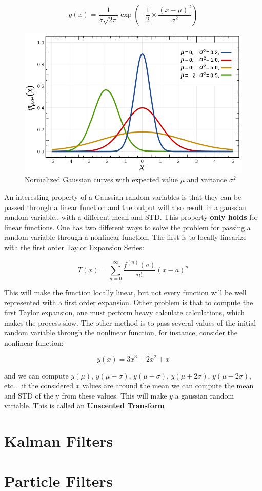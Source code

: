 \begin{equation}
    \label{eq: gaussian pdf}
    g(x) = \frac{1}{\sigma\sqrt{2\pi}}\exp(-\frac{1}{2}\times\frac{(x - \mu)^2}{\sigma^2})
\end{equation}

\begin{figure}[H]
    \centering
    \includegraphics[width=0.5\linewidth]{images/statistics/Normal_Distribution_PDF.png}
    \caption{Normalized Gaussian curves with expected value $\mu$ and variance $\sigma^2$ \cite{enwiki:1100476982}}
    \label{fig: normal pdf}
\end{figure}

An interesting property of a Gaussian random variables is that they can be passed through a linear function and the output will also result in a gaussian random variable,, with a different mean and \acs*{STD}. This property \textbf{only holds} for linear functions. One has two different ways to solve the problem for passing a random variable through a nonlinear function. The first is to locally linearize with the first order Taylor Expansion Series:

\begin{equation}
    T(x) = \sum_{n=0}^{\infty} \frac{f^{(n)}(a)}{n!}(x-a)^n
\end{equation}


This will make the function locally linear, but not every function will be well represented with a first order expansion. Other problem is that to compute the first Taylor expansion, one must perform heavy calculate calculations, which makes the process slow.
The other method is to pass several values of the initial random variable through the nonlinear function, for instance, consider the nonlinear function:

\begin{equation}
    y(x) = 3x^3 + 2x^2 + x
\end{equation}

and we can compute $y(\mu)$, $y(\mu+\sigma)$, $y(\mu-\sigma)$, $y(\mu+2\sigma)$, $y(\mu-2\sigma)$, etc... if the considered $x$ values are around the mean we can compute the mean and \acs*{STD} of the y from these values. This will make $y$ a gaussian random variable. This is called an \textbf{Unscented Transform}


\section{Kalman Filters}



\section{Particle Filters}